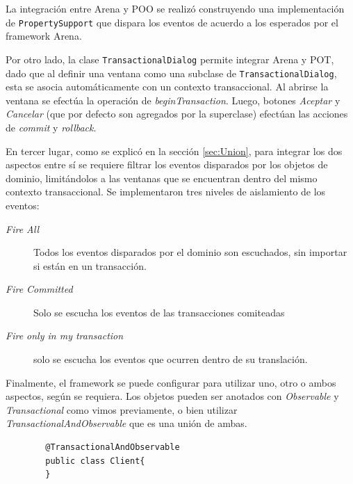 La integración entre Arena y POO se realizó construyendo una implementación de
\lstinline|PropertySupport| que dispara los eventos de acuerdo a los esperados
por el framework Arena.

\medskip
Por otro lado, la clase \lstinline|TransactionalDialog| permite integrar Arena y
POT, dado que al definir una ventana como una subclase de
\lstinline|TransactionalDialog|, esta se asocia automáticamente con un
contexto transaccional.
Al abrirse la ventana se efectúa la operación de \emph{beginTransaction}.
Luego, botones \emph{Aceptar} y \emph{Cancelar} (que por defecto son agregados
por la superclase) efectúan las acciones de \emph{commit} y
\emph{rollback}.

\medskip
En tercer lugar, como se explicó en la sección \ref{sec:Union}, para integrar
los dos aspectos entre sí se requiere filtrar los eventos disparados por los objetos de dominio, 
limitándolos a las ventanas que se encuentran dentro del mismo contexto
transaccional. 
Se implementaron tres niveles de aislamiento de los eventos:
\begin{description}
	\item[\emph{Fire All}] Todos los eventos disparados por el dominio son
	escuchados, sin importar si están en un transacción.

	\item[\emph{Fire Committed}] Solo se escucha los eventos de las transacciones
		comiteadas
	
	\item[\emph{Fire only in my transaction}] solo se escucha los eventos que
		ocurren dentro de su translación.
 \end{description}
 
\medskip
Finalmente, el framework se puede configurar para utilizar uno, otro o ambos
aspectos, según se requiera.
Los objetos pueden ser anotados con \emph{Observable} y
\emph{Transactional} como vimos previamente, 
o bien utilizar \emph{TransactionalAndObservable} que es una unión de ambas.

	\begin{lstlisting} 
		@TransactionalAndObservable
		public class Client{
		}
	\end{lstlisting}

